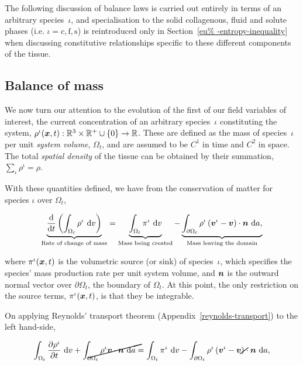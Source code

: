 The following discussion of balance laws is carried out entirely in
terms of an arbitrary species~$\iota$, and specialisation to the solid
collagenous, fluid and solute phases (i.e. \mbox{$\iota=\mathrm{c},
  \mathrm{f}, \mathrm{s}$}) is reintroduced only in Section~\ref{eu%
  -entropy-inequality} when discussing constitutive relationships
specific to these different components of the tissue.

\subsection{Balance of mass}
\label{eu-balance-of-mass}

We now turn our attention to the evolution of the first of our field
variables of interest, the current concentration of an arbitrary
species~$\iota$ constituting the system, $\rho^{\iota}(\mbox{\boldmath$ x$},t):
\mathbb{R}^3\times\mathbb{R}^{+}\cup\{0\} \rightarrow
\mathbb{R}$. These are defined as the mass of species~$\iota$ per unit
       {\em system volume}, $\Omega_{t}$, and are assumed to be
       $\mathit{C}^{1}$ in time and $\mathit{C}^{2}$ in space. The
       total {\em spatial density} of the tissue can be obtained by
       their summation, $\sum\limits_{\iota}\rho^\iota = \rho$.

With these quantities defined, we have from the conservation of matter
for species $\iota$ over $\Omega_{t}$,

\begin{equation}
\underbrace{\frac{\mathrm{d}} {\mathrm{d}t}\left(\int_{\Omega_{t}}
  \rho^{\iota} \ \mathrm{d}v \right)}_{\text{Rate of change of mass}}
= \underbrace{\int_{\Omega_{t}} \pi^{\iota} \ \mathrm{d}v}_{\text{Mass
    being created}} - \underbrace{\int_{\partial \Omega_{t}}
  \rho^{\iota} \left(\mbox{\boldmath$ v$}^{\iota} - \mbox{\boldmath$ v$}\right) \cdot
  \mbox{\boldmath$ n$}\ \mathrm{d}a,}_{\text{Mass leaving the domain}}
\label{eu-globalbalanceofmass}
\end{equation}

\noindent where $\pi^{\iota}(\mbox{\boldmath$ x$},t)$ is the volumetric source (or
sink) of species~$\iota$, which specifies the species' mass production
rate per unit system volume, and $\mbox{\boldmath$ n$}$ is the outward normal vector
over $\partial \Omega_{t}$, the boundary of $\Omega_{t}$. At this
point, the only restriction on the source terms, $\pi^{\iota}(\mbox{\boldmath$ x$},t)$,
is that they be integrable.

On applying Reynolds' transport theorem
(Appendix~\ref{reynolds-transport}) to the left hand-side,

\begin{equation*}
\int_{\Omega_{t}} \frac{\partial \rho^{\iota}}{\partial t}
\ \mathrm{d}v + \cancel{\int_{\partial \Omega_{t}} \rho^{\iota} \bv
  \cdot \bn\ \mathrm{d}a} = \int_{\Omega_{t}} \pi^{\iota}
\ \mathrm{d}v - \int_{\partial \Omega_{t}} \rho^{\iota}
\left(\bv^{\iota} - \cancel{\bv}\right) \cdot \bn\ \mathrm{d}a,
\end{equation*}

